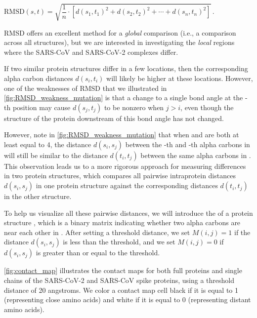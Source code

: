 \begin{center}
$\text{RMSD}(s, t) = \sqrt{\dfrac{1}{n} \cdot \left[d(s_1, t_1)^2 + d(s_2, t_2)^2 + \cdots + d(s_n, t_n)^2\right]}$\,.
\end{center}

\noindent RMSD offers an excellent method for a \textit{global} comparison (i.e., a comparison across all structures), but we are interested in investigating the \textit{local} regions where the SARS-CoV and SARS-CoV-2 complexes differ.

If two similar protein structures differ in a few locations, then the corresponding alpha carbon distances $d(s_{i}, t_{i})$ will likely be higher at these locations. However, one of the weaknesses of RMSD that we illustrated in \autoref{fig:RMSD_weakness_mutation} is that a change to a single bond angle at the -th position may cause $d(s_{j}, t_{j})$ to be nonzero when $j > i$, even though the structure of the protein downstream of this bond angle has not changed.

However, note in \autoref{fig:RMSD_weakness_mutation}  that when  and  are both at least equal to 4, the distance $d(s_{i}, s_{j})$ between the -th and -th alpha carbons in  will still be similar to the distance $d(t_{i}, t_{j})$ between the same alpha carbons in . This observation leads us to a more rigorous approach for measuring differences in two protein structures, which compares all pairwise intraprotein distances $d(s_{i}, s_{j})$ in one protein structure against the corresponding distances $d(t_{i}, t_{j})$ in the other structure.

To help us visualize all these pairwise distances, we will introduce the  of a protein structure , which is a binary matrix indicating whether two alpha carbons are near each other in . After setting a threshold distance, we set $M(i, j) = 1$ if the distance $d(s_{i}, s_{j})$ is less than the threshold, and we set $M(i, j) = 0$ if $d(s_{i}, s_{j})$ is greater than or equal to the threshold.

\autoref{fig:contact_map} illustrates the contact maps for both full proteins and single chains of the SARS-CoV-2 and SARS-CoV spike proteins, using a threshold distance of 20 angstroms. We color a contact map cell black if it is equal to 1 (representing close amino acids) and white if it is equal to 0 (representing distant amino acids).\\

